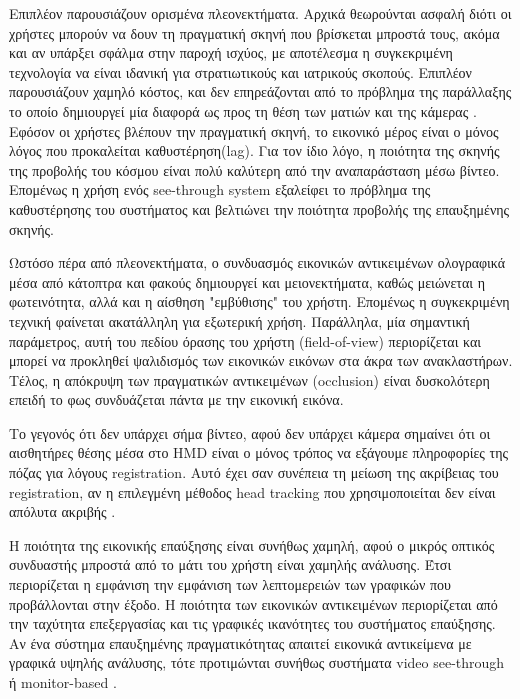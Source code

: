 Επιπλέον παρουσιάζουν ορισμένα πλεονεκτήματα. Αρχικά θεωρούνται ασφαλή διότι οι χρήστες μπορούν να δουν τη πραγματική σκηνή που βρίσκεται μπροστά τους, ακόμα και αν υπάρξει σφάλμα στην παροχή ισχύος, με αποτέλεσμα η συγκεκριμένη τεχνολογία να είναι ιδανική για στρατιωτικούς και ιατρικούς σκοπούς. Επιπλέον παρουσιάζουν χαμηλό κόστος, και δεν επηρεάζονται από το πρόβλημα της παράλλαξης το οποίο δημιουργεί μία διαφορά ως προς τη θέση των ματιών και της κάμερας \cite{krevelen2010}. Εφόσον οι χρήστες βλέπουν την πραγματική σκηνή, το εικονικό μέρος είναι ο μόνος λόγος που προκαλείται καθυστέρηση(lag). Για τον ίδιο λόγο, η ποιότητα της σκηνής της προβολής του κόσμου είναι πολύ καλύτερη από την αναπαράσταση μέσω βίντεο. Επομένως η χρήση ενός see-through system εξαλείφει το πρόβλημα της καθυστέρησης του συστήματος και βελτιώνει την ποιότητα προβολής της επαυξημένης σκηνής. 


Ωστόσο πέρα από πλεονεκτήματα, ο συνδυασμός εικονικών αντικειμένων ολογραφικά μέσα από κάτοπτρα και φακούς δημιουργεί και μειονεκτήματα, καθώς μειώνεται η φωτεινότητα, αλλά και η αίσθηση "εμβύθισης" του χρήστη. Επομένως η συγκεκριμένη τεχνική φαίνεται ακατάλληλη για εξωτερική χρήση. Παράλληλα, μία σημαντική παράμετρος, αυτή του πεδίου όρασης του χρήστη (field-of-view) περιορίζεται και μπορεί να προκληθεί ψαλιδισμός των εικονικών εικόνων στα άκρα των ανακλαστήρων. Τέλος, η απόκρυψη των πραγματικών αντικειμένων (occlusion) είναι δυσκολότερη επειδή το φως συνδυάζεται πάντα με την εικονική εικόνα. 


Το γεγονός ότι δεν υπάρχει σήμα βίντεο, αφού δεν υπάρχει κάμερα σημαίνει ότι οι αισθητήρες θέσης μέσα στο HMD είναι ο μόνος τρόπος να εξάγουμε πληροφορίες της πόζας για λόγους registration. Αυτό έχει σαν συνέπεια τη μείωση της ακρίβειας του registration, αν η επιλεγμένη μέθοδος head tracking που χρησιμοποιείται δεν είναι απόλυτα ακριβής \cite{Malik2002}.

H ποιότητα της εικονικής επαύξησης είναι συνήθως χαμηλή, αφού ο μικρός οπτικός συνδυαστής μπροστά από το μάτι του χρήστη είναι χαμηλής ανάλυσης. Έτσι περιορίζεται η εμφάνιση την εμφάνιση των λεπτομερειών των γραφικών που προβάλλονται στην έξοδο. Η ποιότητα των εικονικών αντικειμένων περιορίζεται από την ταχύτητα επεξεργασίας και τις γραφικές ικανότητες του συστήματος επαύξησης. Αν ένα σύστημα επαυξημένης πραγματικότητας απαιτεί εικονικά αντικείμενα με γραφικά υψηλής ανάλυσης, τότε προτιμώνται συνήθως συστήματα video see-through ή monitor-based \cite{Mcdonald2003} . 


